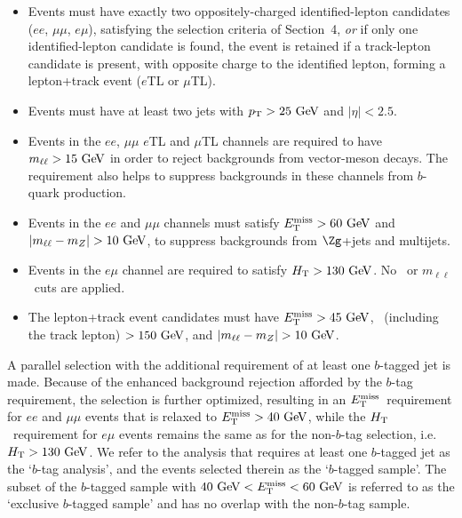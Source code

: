 \begin{itemize}

\item Events must have exactly two oppositely-charged identified-lepton candidates ($ee$, $\mu\mu$,
  $e\mu$), satisfying the selection criteria of Section~4, {\em or} if only one identified-lepton candidate is found, the event is retained if a track-lepton candidate is present, with opposite charge to the identified lepton, forming a lepton+track event ($e$TL or $\mu$TL).

\item Events must have at least two jets with $\pT>25\GeV$ and $|\eta|<2.5$.%

\item Events in the $ee$, $\mu\mu$ $e$TL and $\mu$TL channels are required to have $m_{\ell\ell} > 15\GeV$ in order to
reject backgrounds from vector-meson decays. The requirement also helps to suppress backgrounds in these channels from $b$-quark production.

\item Events in the $ee$ and $\mu\mu$ channels must satisfy $\MET>60\GeV$ and $|m_{\ell\ell} - m_Z| > 10\GeV$,
to suppress backgrounds from $\Zg$+jets and multijets.

\item
Events in the $e\mu$ channel are required to satisfy $\HT>130\GeV$. No \MET\ or $m_{\ell\ell}$\ cuts are applied.

\item The lepton+track event candidates must have  $\MET>45\GeV$, \HT\ (including the
track lepton) $>150\GeV$, and $|m_{\ell\ell} - m_Z| > 10\GeV$.

\end{itemize}

A parallel selection with the additional requirement of at least one
$b$-tagged jet is made. Because of the enhanced background rejection
afforded by the $b$-tag requirement, the selection is further
optimized, resulting in an $E_{\mathrm{T}}^{\mathrm{miss}}$\ requirement for $ee$ and $\mu\mu$
events that is relaxed to $\MET>40\GeV$, while the $H_{\mathrm{T}}$\
requirement for $e\mu$ events remains the same as for the
non-$b$-tag selection, i.e. $\HT> 130\GeV$.  We refer to the
analysis that requires at least one $b$-tagged jet as the `$b$-tag
analysis', and the events selected therein as the `$b$-tagged
sample'.  The subset of the $b$-tagged sample with $40\GeV<
\MET<60\GeV$ is referred to as the `exclusive $b$-tagged sample' and
has no overlap with the non-$b$-tag sample.

